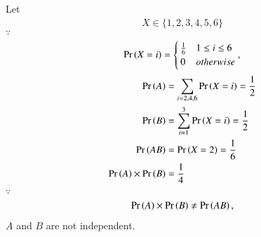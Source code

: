     Let 
    \begin{align}
    X \in \{1,2,3,4,5,6\}
    \end{align}
    $\because$
    \begin{align}
    \Pr\left(X=i\right)=\begin{cases}
        \frac{1}{6}& 1 \le i \le 6\\
        0 & otherwise
        \end{cases},
    \end{align}
    \begin{align}
        \Pr\left(A\right) &={\sum_{i=2,4,6}\Pr\left(X=i\right)}=\frac{1}{2} \\
        \Pr\left(B\right)  &= {\sum_{i=1}^{3}\Pr\left(X=i\right)}=\frac{1}{2} \\
        \Pr\left(AB\right) &= \Pr\left(X=2\right)=\frac{1}{6}\\
         \Pr\left(A\right)\times \Pr\left(B\right) &= \frac{1}{4}
    \end{align}
    $\because$
    \begin{align}
        \Pr\left(A\right)\times \Pr\left(B\right) \neq \Pr\left(AB\right),
    \end{align}
    $ A$ and $B$ are not independent.